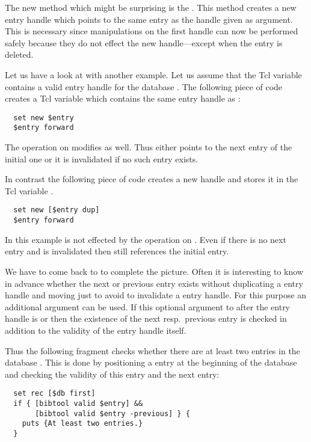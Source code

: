 The new method which might be surprising is the .
This method creates a new entry handle which points to the same entry
as the handle given as argument. This is necessary since manipulations
on the first handle can now be performed safely because they do not
effect the new handle---except when the entry is deleted.

Let us have a look at  with another example. Let us
assume that the Tcl variable  contains a valid entry handle
for the database . The following piece of code creates a Tcl
variable  which contains the same entry handle as
:
\begin{verbatim}
  set new $entry
  $entry forward
\end{verbatim}
The  operation on  modifies  as
well. Thus  either points to the next entry of the initial
one or it is invalidated if no such entry exists.

In contrast the following piece of code creates a new handle and stores
it in the Tcl variable .
\begin{verbatim}
  set new [$entry dup]
  $entry forward
\end{verbatim}
In this example  is not effected by the 
operation on . Even if there is no next entry and
 is invalidated then  still references the initial
entry. 

We have to come back to  to complete the picture.
Often it is interesting to know in advance whether the next or
previous entry exists without duplicating a entry handle and moving
just to avoid to invalidate a entry handle. For this purpose an
additional argument can be used. If this optional argument to
 after the entry handle is  or
 then the existence of the next resp.\ previous entry
is checked in addition to the validity of the entry handle itself. 

Thus the following fragment checks whether there are at least two
entries in the database . This is done by positioning a entry at
the beginning of the database and checking the validity of this
entry and the next entry:
\begin{verbatim}
  set rec [$db first]
  if { [bibtool valid $entry] &&
       [bibtool valid $entry -previous] } {
    puts {At least two entries.}
  }
\end{verbatim}%

